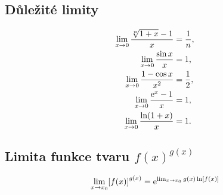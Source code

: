 \documentclass[columns=2]{cheatsheet}
\begin{document}

\subsection{Důležité limity}
\setlength{\jot}{6pt}
\begin{align*}
  \lim_{x \to 0} \frac{\sqrt[n]{1 + x} - 1}{x} 
  &=
  \frac{1}{n},
  \\
  \lim_{x \to 0} \frac{\sin x}{x} 
  &= 
  1,
  \\
  \lim_{x \to 0} \frac{1 - \cos x}{x^2} 
  &= 
  \frac{1}{2},
  \\
  \lim_{x \to 0} \frac{\exponential{x} - 1}{x}
  &=
  1,
  \\
  \lim_{x \to 0} \frac{\ln\parens{1 + x}}{x}
  &=
  1.
\end{align*}

\subsection{Limita funkce tvaru $f(x)^{g(x)}$}
\begin{equation*}
  \lim_{x \to x_0} \brackets{f(x)}^{g(x)}
  =
  \exponential{\lim_{x \to x_0} g(x) \ln \brackets{f(x)}}
\end{equation*}

%
\end{document}
